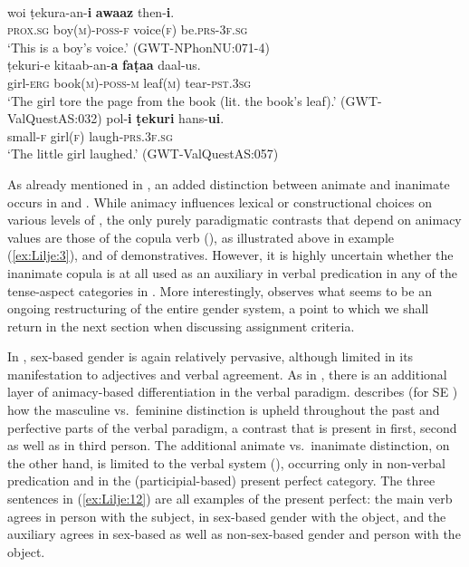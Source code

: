 \documentclass[output=collectionpaper]{langsci/langscibook}
\begin{document}
\ea
\label{ex:Lilje:11}
\\
\begin{xlist}
\ex
\gll woi ṭekura-an-\textbf{i} \textbf{awaaz} then-\textbf{i}.    \\
\textsc{prox.sg} boy(\textsc{m})-\textsc{poss-f} voice(\textsc{f}) be.\textsc{prs-3f.sg}    \\
\glt `This is a boy's voice.' (GWT-NPhonNU:071-4)\\
\ex
\gll ṭekuri-e kitaab-an-\textbf{a} \textbf{faṭaa} daal{}-us.    \\
girl-\textsc{erg} book(\textsc{m})-\textsc{poss-m} leaf(\textsc{m}) tear-\textsc{pst.3sg}    \\
\glt `The girl tore the page from the book (lit. the book's leaf).' (GWT-ValQuestAS:032)
\ex
\gll pol-\textbf{i} \textbf{ṭekuri} hans-\textbf{ui}.     \\
small-\textsc{f} girl(\textsc{f}) laugh-\textsc{prs.3f.sg}     \\
\glt `The little girl laughed.' (GWT-ValQuestAS:057)\\
\end{xlist}
\z

As already mentioned in , an added distinction between animate and inanimate occurs in  and . While animacy influences lexical or constructional choices on various levels of , the only purely paradigmatic contrasts that depend on animacy values are those of the copula verb (\citealt[121--125]{Perder2013}), as illustrated above in example (\ref{ex:Lilje:3}), and of demonstratives. However, it is highly uncertain whether the inanimate copula is at all used as an auxiliary in verbal predication in any of the tense-aspect categories in . More interestingly, \citet[51--55]{Perder2013} observes what seems to be an ongoing restructuring of the entire gender system, a point to which we shall return in the next section when discussing assignment criteria.

In , sex-based gender is again relatively pervasive, although limited in its manifestation to adjectives and verbal agreement. As in , there is an additional layer of animacy-based differentiation in the verbal paradigm. \citet[255]{Lehr2014} describes (for SE ) how the masculine vs.\ feminine distinction is upheld throughout the past and perfective parts of the verbal paradigm, a contrast that is present in first, second as well as in third person. The additional animate vs.\ inanimate distinction, on the other hand, is limited to the verbal system (\citeyear[256--257]{Lehr2014}), occurring only in non-verbal predication and in the (participial-based) present perfect category. The three sentences in (\ref{ex:Lilje:12}) are all examples of the present perfect: the main verb agrees in person with the subject, in sex-based gender with the object, and the auxiliary agrees in sex-based as well as non-sex-based gender and person with the object.
\end{document}
